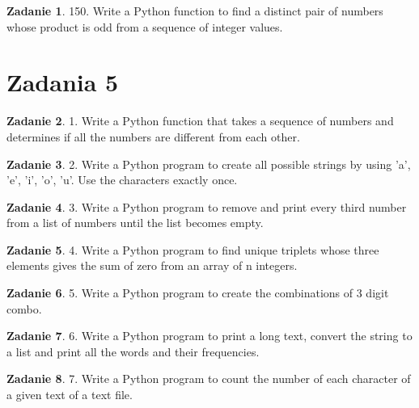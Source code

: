 \documentclass[11pt]{article}
\theoremstyle{definition}
\newtheorem{zadanie}{Zadanie}
\begin{document}
\begin{zadanie}
150. Write a Python function to find a distinct pair of numbers whose product is odd from a sequence of integer values. 
\end{zadanie}

\section{Zadania 5}
\begin{zadanie}
1. Write a Python function that takes a sequence of numbers and determines if all the numbers are different from each other. 

\end{zadanie}

\begin{zadanie}


2. Write a Python program to create all possible strings by using 'a', 'e', 'i', 'o', 'u'. Use the characters exactly once. 

\end{zadanie}

\begin{zadanie}


3. Write a Python program to remove and print every third number from a list of numbers until the list becomes empty.

\end{zadanie}

\begin{zadanie}


4. Write a Python program to find unique triplets whose three elements gives the sum of zero from an array of n integers. 

\end{zadanie}

\begin{zadanie}


5. Write a Python program to create the combinations of 3 digit combo. 

\end{zadanie}

\begin{zadanie}


6. Write a Python program to print a long text, convert the string to a list and print all the words and their frequencies. 

\end{zadanie}

\begin{zadanie}


7. Write a Python program to count the number of each character of a given text of a text file. 

\end{zadanie}
\end{document}
